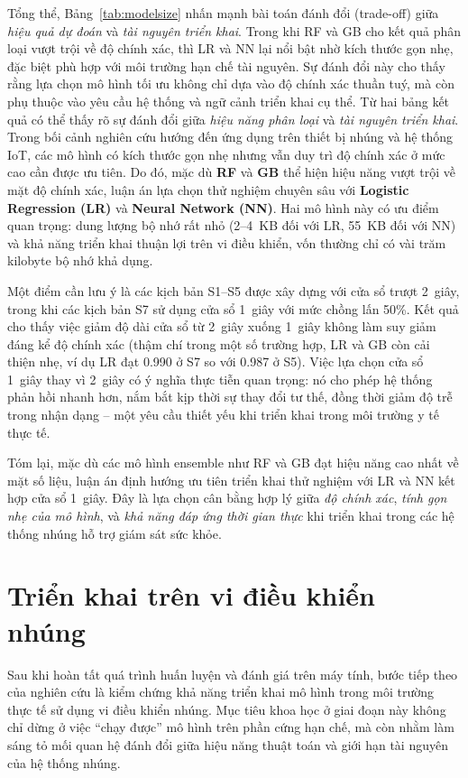 Tổng thể, Bảng~\ref{tab:modelsize} nhấn mạnh bài toán đánh đổi (trade-off) giữa \emph{hiệu quả dự đoán} và \emph{tài nguyên triển khai}. 
Trong khi RF và GB cho kết quả phân loại vượt trội về độ chính xác, 
thì LR và NN lại nổi bật nhờ kích thước gọn nhẹ, đặc biệt phù hợp với môi trường hạn chế tài nguyên. 
Sự đánh đổi này cho thấy rằng lựa chọn mô hình tối ưu không chỉ dựa vào độ chính xác thuần tuý, 
mà còn phụ thuộc vào yêu cầu hệ thống và ngữ cảnh triển khai cụ thể.
Từ hai bảng kết quả có thể thấy rõ sự đánh đổi giữa \emph{hiệu năng phân loại} và \emph{tài nguyên triển khai}. 
Trong bối cảnh nghiên cứu hướng đến ứng dụng trên thiết bị nhúng và hệ thống IoT, 
các mô hình có kích thước gọn nhẹ nhưng vẫn duy trì độ chính xác ở mức cao cần được ưu tiên. 
Do đó, mặc dù \textbf{RF} và \textbf{GB} thể hiện hiệu năng vượt trội về mặt độ chính xác, 
luận án lựa chọn thử nghiệm chuyên sâu với \textbf{Logistic Regression (LR)} và \textbf{Neural Network (NN)}. 
Hai mô hình này có ưu điểm quan trọng: dung lượng bộ nhớ rất nhỏ (2--4~KB đối với LR, 55~KB đối với NN) 
và khả năng triển khai thuận lợi trên vi điều khiển, vốn thường chỉ có vài trăm kilobyte bộ nhớ khả dụng.  

Một điểm cần lưu ý là các kịch bản S1–S5 được xây dựng với cửa sổ trượt 2~giây, 
trong khi các kịch bản S7 sử dụng cửa sổ 1~giây với mức chồng lấn 50\%. 
Kết quả cho thấy việc giảm độ dài cửa sổ từ 2~giây xuống 1~giây không làm suy giảm đáng kể độ chính xác 
(thậm chí trong một số trường hợp, LR và GB còn cải thiện nhẹ, ví dụ LR đạt 0.990 ở S7 so với 0.987 ở S5). 
Việc lựa chọn cửa sổ 1~giây thay vì 2~giây có ý nghĩa thực tiễn quan trọng: 
nó cho phép hệ thống phản hồi nhanh hơn, nắm bắt kịp thời sự thay đổi tư thế, 
đồng thời giảm độ trễ trong nhận dạng – một yêu cầu thiết yếu khi triển khai trong môi trường y tế thực tế.  

Tóm lại, mặc dù các mô hình ensemble như RF và GB đạt hiệu năng cao nhất về mặt số liệu, 
luận án định hướng ưu tiên triển khai thử nghiệm với LR và NN kết hợp cửa sổ 1~giây. 
Đây là lựa chọn cân bằng hợp lý giữa \emph{độ chính xác}, \emph{tính gọn nhẹ của mô hình}, 
và \emph{khả năng đáp ứng thời gian thực} khi triển khai trong các hệ thống nhúng hỗ trợ giám sát sức khỏe.

\section{Triển khai trên vi điều khiển nhúng}

Sau khi hoàn tất quá trình huấn luyện và đánh giá trên máy tính, bước tiếp theo của nghiên cứu là kiểm chứng khả năng triển khai mô hình trong môi trường thực tế sử dụng vi điều khiển nhúng. Mục tiêu khoa học ở giai đoạn này không chỉ dừng ở việc “chạy được” mô hình trên phần cứng hạn chế, mà còn nhằm làm sáng tỏ mối quan hệ đánh đổi giữa hiệu năng thuật toán và giới hạn tài nguyên của hệ thống nhúng.  

